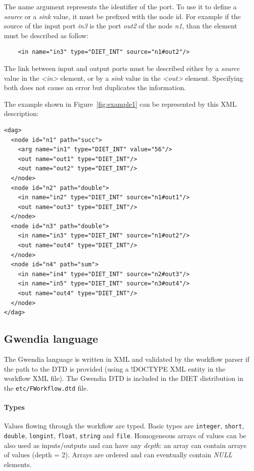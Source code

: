 The name argument represents the identifier of the port. To use it to
define a \textit{source} or a \textit{sink} value, it must be prefixed
with the node id. For example if the source of the input port
\textit{in3} is the port \textit{out2} of the node \textit{n1}, than
the element must be described as follow:

\begin{verbatim}
    <in name="in3" type="DIET_INT" source="n1#out2"/>
\end{verbatim}

The link between input and output ports must be described either by
a \textit{source} value in the \textit{<in>} element, or by a
\textit{sink} value in the \textit{<out>} element. Specifying both
does not cause an error but duplicates the information.

The example shown in Figure~\ref{fig:example1} can be represented by
this XML description:

\begin{verbatim}
<dag>
  <node id="n1" path="succ">
    <arg name="in1" type="DIET_INT" value="56"/>
    <out name="out1" type="DIET_INT"/>
    <out name="out2" type="DIET_INT"/>
  </node>
  <node id="n2" path="double">
    <in name="in2" type="DIET_INT" source="n1#out1"/>
    <out name="out3" type="DIET_INT"/>
  </node>
  <node id="n3" path="double">
    <in name="in3" type="DIET_INT" source="n1#out2"/>
    <out name="out4" type="DIET_INT"/>
  </node>
  <node id="n4" path="sum">
    <in name="in4" type="DIET_INT" source="n2#out3"/>
    <in name="in5" type="DIET_INT" source="n3#out4"/>
    <out name="out4" type="DIET_INT"/>
  </node>
</dag>
\end{verbatim}

\subsection{Gwendia language}
\label{sec:wf_desc}
The Gwendia language is written in XML and validated by the workflow parser if the path to the DTD is provided (using a !DOCTYPE XML entity in the workflow XML file). The Gwendia DTD is included in the DIET distribution in the \verb|etc/FWorkflow.dtd| file.

\paragraph{Types} Values flowing through the workflow are typed.
Basic types are \texttt{integer}, \texttt{short}, \texttt{double},
\texttt{longint}, \texttt{float}, \texttt{string} and
\texttt{file}. Homogeneous arrays of values can be also used as
inputs/outputs and can have any \textit{depth}: an array can
contain arrays of values (depth = 2). Arrays are ordered and can
eventually contain \textit{NULL} elements.

